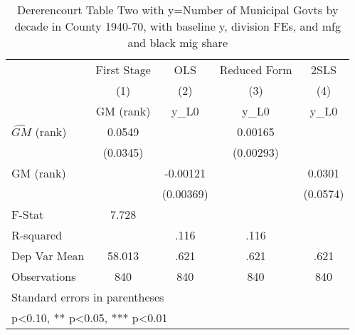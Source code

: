 \begin{table}[htbp]\centering
\def\sym#1{\ifmmode^{#1}\else\(^{#1}\)\fi}
\caption{Dererencourt Table Two with y=Number of Municipal Govts by decade in County 1940-70, with baseline y, division FEs, and mfg and black mig share}
\begin{tabular}{l*{4}{c}}
\toprule
                    & First Stage   &         OLS   &Reduced Form   &        2SLS   \\
                    &\multicolumn{1}{c}{(1)}&\multicolumn{1}{c}{(2)}&\multicolumn{1}{c}{(3)}&\multicolumn{1}{c}{(4)}\\
                    &\multicolumn{1}{c}{GM  (rank)}&\multicolumn{1}{c}{y\_L0}&\multicolumn{1}{c}{y\_L0}&\multicolumn{1}{c}{y\_L0}\\
\midrule
$\hat{GM}$ (rank)   &      0.0549   &               &     0.00165   &               \\
                    &    (0.0345)   &               &   (0.00293)   &               \\
\addlinespace
GM  (rank)          &               &    -0.00121   &               &      0.0301   \\
                    &               &   (0.00369)   &               &    (0.0574)   \\
\midrule
F-Stat              &       7.728   &               &               &               \\
R-squared           &               &        .116   &        .116   &               \\
Dep Var Mean        &      58.013   &        .621   &        .621   &        .621   \\
Observations        &         840   &         840   &         840   &         840   \\
\bottomrule
\multicolumn{5}{l}{\footnotesize Standard errors in parentheses}\\
\multicolumn{5}{l}{\footnotesize * p<0.10, ** p<0.05, *** p<0.01}\\
\end{tabular}
\end{table}
